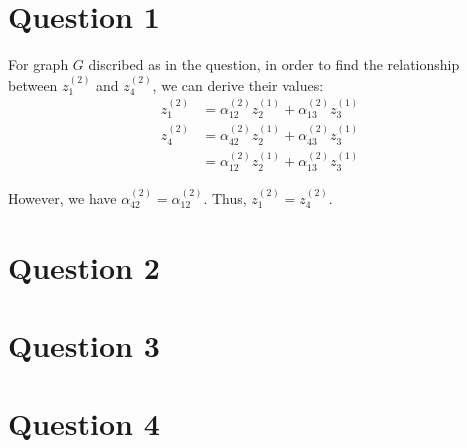 \documentclass[a4paper]{article}
\begin{document}



\section*{Question 1}
For graph $G$ discribed as in the question, in order to find the 
relationship between $z_1^{(2)}$ and $z_4^{(2)}$, we can derive their
values:
\begin{align*}
    z_1^{(2)} &= \alpha_{12}^{(2)} z_2^{(1)} + \alpha_{13}^{(2)} z_3^{(1)} \\
    z_4^{(2)} &= \alpha_{42}^{(2)} z_2^{(1)} + \alpha_{43}^{(2)} z_3^{(1)} \\
              &= \alpha_{12}^{(2)} z_2^{(1)} + \alpha_{13}^{(2)} z_3^{(1)}
\end{align*}

However, we have $\alpha_{42}^{(2)} = \alpha_{12}^{(2)}$. Thus,
$z_1^{(2)} = z_4^{(2)}$.

\section*{Question 2}

\section*{Question 3}

\section*{Question 4}




\end{document}
